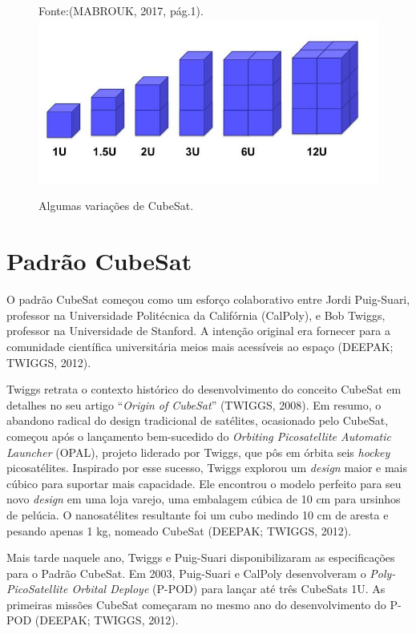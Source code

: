 \begin{figure}[h]
	\centering
    
    Fonte:(MABROUK, 2017, pág.1).
	\includegraphics[keepaspectratio=true,scale=0.58]{figuras/cubesatVariacoes.PNG}
	\caption{Algumas variações de CubeSat.}
	\label{fig04}
\end{figure}

\section{Padrão CubeSat}

O padrão CubeSat começou como um esforço colaborativo entre Jordi Puig-Suari, professor na Universidade Politécnica da Califórnia (CalPoly), e Bob Twiggs, professor na Universidade de Stanford. A intenção original era fornecer para a comunidade científica universitária meios mais acessíveis ao espaço (DEEPAK; TWIGGS, 2012).

Twiggs retrata o contexto histórico do desenvolvimento do conceito CubeSat em detalhes no seu artigo “\textit{Origin of CubeSat}” (TWIGGS, 2008). Em resumo, o abandono radical do design tradicional de satélites, ocasionado pelo CubeSat, começou após o lançamento bem-sucedido do \textit{Orbiting Picosatellite Automatic Launcher} (OPAL), projeto liderado por Twiggs, que pôs em órbita seis \textit{hockey} picosatélites. Inspirado por esse sucesso, Twiggs explorou um \textit{design} maior e mais cúbico para suportar mais capacidade. Ele encontrou o modelo perfeito para seu novo \textit{design} em uma loja varejo, uma embalagem cúbica de 10 cm para ursinhos de pelúcia. O nanosatélites resultante foi um cubo medindo 10 cm de aresta e pesando apenas 1 kg, nomeado CubeSat (DEEPAK; TWIGGS, 2012).

Mais tarde naquele ano, Twiggs e Puig-Suari disponibilizaram as especificações para o Padrão CubeSat. Em 2003, Puig-Suari e CalPoly desenvolveram o \textit{Poly-PicoSatellite Orbital Deploye} (P-POD) para lançar até três CubeSats 1U. As primeiras missões CubeSat começaram no  mesmo ano do desenvolvimento do P-POD (DEEPAK; TWIGGS, 2012).

